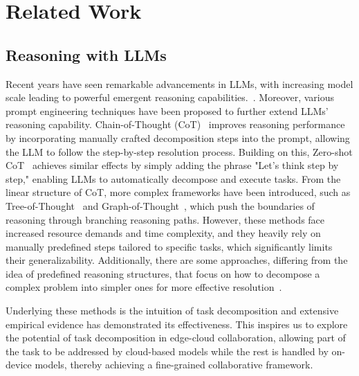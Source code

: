 \section{Related Work}
\subsection{Reasoning with LLMs}

Recent years have seen remarkable advancements in LLMs, with increasing model scale leading to powerful emergent reasoning capabilities.~\cite{wei2022emergent, xu2025towards}. Moreover, various prompt engineering techniques have been proposed to further extend LLMs' reasoning capability.
Chain-of-Thought (CoT)~\cite{wei2022chain} improves reasoning performance by incorporating manually crafted decomposition steps into the prompt, allowing the LLM to follow the step-by-step resolution process. Building on this, Zero-shot CoT~\cite{kojima2022large} achieves similar effects by simply adding the phrase "Let's think step by step," enabling LLMs to automatically decompose and execute tasks.
From the linear structure of CoT, more complex frameworks have been introduced, such as Tree-of-Thought~\cite{yao2023tree} and Graph-of-Thought~\cite{besta2024graph}, which push the boundaries of reasoning through branching reasoning paths. However, these methods face increased resource demands and time complexity, and they heavily rely on manually predefined steps tailored to specific tasks, which significantly limits their generalizability. Additionally, there are some approaches, differing from the idea of predefined reasoning structures, that focus on how to decompose a complex problem into simpler ones for more effective resolution~\cite{ zhou2022least, khot2022decomposed, shang2024agentsquare, shang2024defint}.

Underlying these methods is the intuition of task decomposition and extensive empirical evidence has demonstrated its effectiveness. This inspires us to explore the potential of task decomposition in edge-cloud collaboration, allowing part of the task to be addressed by cloud-based models while the rest is handled by on-device models, thereby achieving a fine-grained collaborative framework.


